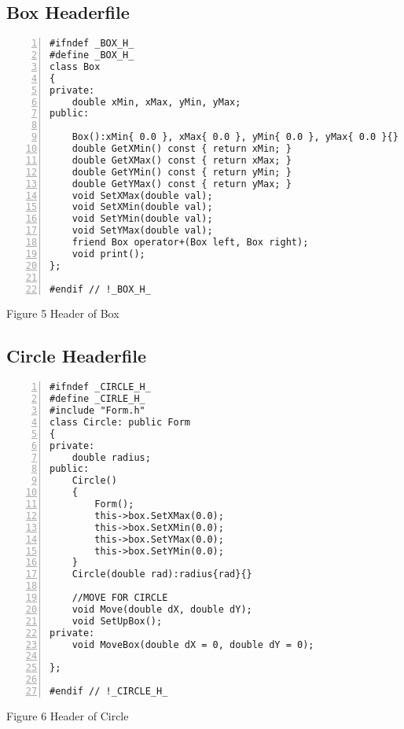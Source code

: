 \documentclass{llncs}
\begin{document}
\subsection{Box Headerfile}

\begin{lstlisting}[basicstyle=\footnotesize\ttfamily, numbers=left, stepnumber=1, numberstyle = \normalsize]
#ifndef _BOX_H_
#define _BOX_H_
class Box
{
private:
	double xMin, xMax, yMin, yMax;
public:
	
	Box():xMin{ 0.0 }, xMax{ 0.0 }, yMin{ 0.0 }, yMax{ 0.0 }{}
	double GetXMin() const { return xMin; }
	double GetXMax() const { return xMax; }
	double GetYMin() const { return yMin; }
	double GetYMax() const { return yMax; }
	void SetXMax(double val);
	void SetXMin(double val);
	void SetYMin(double val);
	void SetYMax(double val);
	friend Box operator+(Box left, Box right);
	void print(); 
};

#endif // !_BOX_H_
\end{lstlisting}
\footnotesize{Figure 5 Header of Box}
\subsection{Circle Headerfile}
\begin{lstlisting}[basicstyle=\footnotesize\ttfamily, numbers=left, stepnumber=1, numberstyle = \normalsize]
#ifndef _CIRCLE_H_
#define _CIRLE_H_
#include "Form.h"
class Circle: public Form
{
private: 
	double radius; 
public:
	Circle() 
	{
		Form();
		this->box.SetXMax(0.0);
		this->box.SetXMin(0.0);
		this->box.SetYMax(0.0);
		this->box.SetYMin(0.0);
	}
	Circle(double rad):radius{rad}{}

	//MOVE FOR CIRCLE
	void Move(double dX, double dY);
	void SetUpBox();
private:
	void MoveBox(double dX = 0, double dY = 0);
	
};

#endif // !_CIRCLE_H_
\end{lstlisting}
\footnotesize{Figure 6 Header of Circle}
\end{document}
